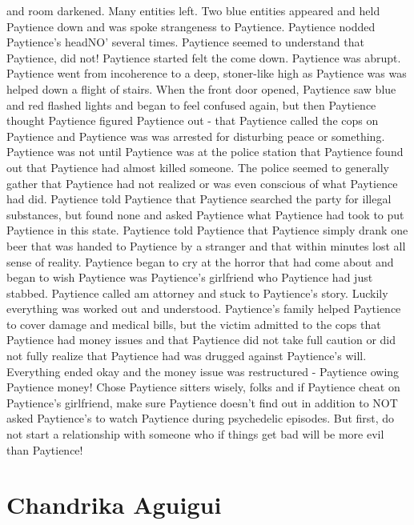 \documentclass[12pt]{book}
\begin{document}
and room darkened. Many entities left. Two blue entities appeared and held Paytience down and was spoke strangeness to Paytience. Paytience nodded Paytience's headNO' several times. Paytience seemed to understand that Paytience, did not! Paytience started felt the come down. Paytience was abrupt. Paytience went from incoherence to a deep, stoner-like high as Paytience was was helped down a flight of stairs. When the front door opened, Paytience saw blue and red flashed lights and began to feel confused again, but then Paytience thought Paytience figured Paytience out - that Paytience called the cops on Paytience and Paytience was was arrested for disturbing peace or something. Paytience was not until Paytience was at the police station that Paytience found out that Paytience had almost killed someone. The police seemed to generally gather that Paytience had not realized or was even conscious of what Paytience had did. Paytience told Paytience that Paytience searched the party for illegal substances, but found none and asked Paytience what Paytience had took to put Paytience in this state. Paytience told Paytience that Paytience simply drank one beer that was handed to Paytience by a stranger and that within minutes lost all sense of reality. Paytience began to cry at the horror that had come about and began to wish Paytience was Paytience's girlfriend who Paytience had just stabbed. Paytience called am attorney and stuck to Paytience's story. Luckily everything was worked out and understood. Paytience's family helped Paytience to cover damage and medical bills, but the victim admitted to the cops that Paytience had money issues and that Paytience did not take full caution or did not fully realize that Paytience had was drugged against Paytience's will. Everything ended okay and the money issue was restructured - Paytience owing Paytience money! Chose Paytience sitters wisely, folks and if Paytience cheat on Paytience's girlfriend, make sure Paytience doesn't find out in addition to NOT asked Paytience's to watch Paytience during psychedelic episodes. But first, do not start a relationship with someone who if things get bad will be more evil than Paytience!



\chapter{Chandrika Aguigui}
\end{document}
